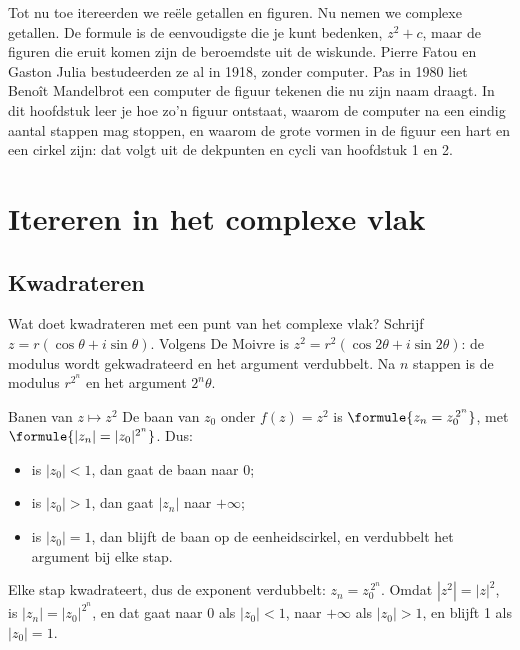 Tot nu toe itereerden we reële getallen en figuren. Nu nemen we complexe getallen. De formule is de eenvoudigste die je kunt bedenken, $z^2 + c$, maar de figuren die eruit komen zijn de beroemdste uit de wiskunde. Pierre Fatou en Gaston Julia bestudeerden ze al in 1918, zonder computer. Pas in 1980 liet Benoît Mandelbrot een computer de figuur tekenen die nu zijn naam draagt. In dit hoofdstuk leer je hoe zo'n figuur ontstaat, waarom de computer na een eindig aantal stappen mag stoppen, en waarom de grote vormen in de figuur een hart en een cirkel zijn: dat volgt uit de dekpunten en cycli van hoofdstuk 1 en 2.

\begin{oefeningen}[Start]

\end{oefeningen}

\section{Itereren in het complexe vlak}

\subsection{Kwadrateren}

Wat doet kwadrateren met een punt van het complexe vlak? Schrijf $z = r(\cos\theta + i\sin\theta)$. Volgens De Moivre is $z^2 = r^2(\cos 2\theta + i\sin 2\theta)$: de modulus wordt gekwadrateerd en het argument verdubbelt. Na $n$ stappen is de modulus $r^{2^n}$ en het argument $2^n\theta$.

\begin{theorie}
\begin{stelling}{Banen van $z \mapsto z^2$}
De baan van $z_0$ onder $f(z) = z^2$ is $\formule{z_n = z_0^{\,2^n}}$, met $\formule{|z_n| = |z_0|^{2^n}}$. Dus:
\begin{itemize}
\item is $|z_0| < 1$, dan gaat de baan naar 0;
\item is $|z_0| > 1$, dan gaat $|z_n|$ naar $+\infty$;
\item is $|z_0| = 1$, dan blijft de baan op de eenheidscirkel, en verdubbelt het argument bij elke stap.
\end{itemize}
\end{stelling}

\begin{bewijs}
Elke stap kwadrateert, dus de exponent verdubbelt: $z_n = z_0^{\,2^n}$. Omdat $|z^2| = |z|^2$, is $|z_n| = |z_0|^{2^n}$, en dat gaat naar 0 als $|z_0| < 1$, naar $+\infty$ als $|z_0| > 1$, en blijft 1 als $|z_0| = 1$.
\end{bewijs}
\end{theorie}


